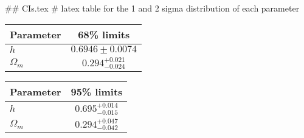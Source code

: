 ## CIs.tex
# latex table for the 1 and 2 sigma distribution of each parameter

\begin{tabular} { l  c}
 Parameter &  68\% limits\\
\hline
{\boldmath$h              $} & $0.6946\pm 0.0074          $\\
{\boldmath$\Omega_m       $} & $0.294^{+0.021}_{-0.024}   $\\
\hline
\end{tabular}

\begin{tabular} { l  c}
 Parameter &  95\% limits\\
\hline
{\boldmath$h              $} & $0.695^{+0.014}_{-0.015}   $\\
{\boldmath$\Omega_m       $} & $0.294^{+0.047}_{-0.042}   $\\
\hline
\end{tabular}
